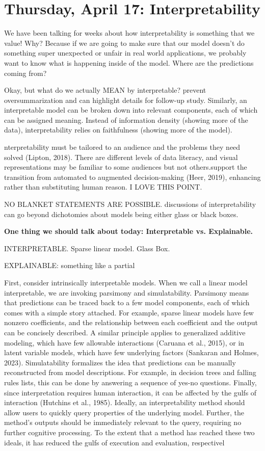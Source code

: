 \section{Thursday, April 17: Interpretability}

We have been talking for weeks about how interpretability is something that we value! Why? Because if we are going to make sure that our model doesn't do something super unexpected or unfair in real world applications, we probably want to know what is happening inside of the model. Where are the predictions coming from? 

Okay, but what do we actually MEAN by interpretable? prevent oversummarization and can
highlight details for follow-up study. Similarly, an interpretable model can be broken down into
relevant components, each of which can be assigned meaning. Instead of information density
(showing more of the data), interpretability relies on faithfulness (showing more of the model).


nterpretability must be tailored
to an audience and the problems they need solved (Lipton, 2018). There are different levels of
data literacy, and visual representations may be familiar to some audiences but not others.support the transition from automated to augmented decision-making (Heer, 2019), enhancing
rather than substituting human reason. I LOVE THIS POINT. 

NO BLANKET STATEMENTS ARE POSSIBLE. discussions of interpretability can go beyond dichotomies about models being either glass or black
boxes.

\textbf{One thing we should talk about today: Interpretable vs. Explainable.}

INTERPRETABLE. Sparse linear model. Glass Box. 

EXPLAINABLE: something like a partial 

 First,
consider intrinsically interpretable models. When we call a linear model interpretable, we are
invoking parsimony and simulatability. Parsimony means that predictions can be traced back to
a few model components, each of which comes with a simple story attached. For example, sparse
linear models have few nonzero coefficients, and the relationship between each coefficient and the
output can be concisely described. A similar principle applies to generalized additive modeling,
which have few allowable interactions (Caruana et al., 2015), or in latent variable models, which
have few underlying factors (Sankaran and Holmes, 2023). Simulatability formalizes the idea that
predictions can be manually reconstructed from model descriptions. For example, in decision trees
and falling rules lists, this can be done by answering a sequence of yes-no questions. Finally, since
interpretation requires human interaction, it can be affected by the gulfs of interaction (Hutchins
et al., 1985). Ideally, an interpretability method should allow users to quickly query properties
of the underlying model. Further, the method’s outputs should be immediately relevant to the
query, requiring no further cognitive processing. To the extent that a method has reached these
two ideals, it has reduced the gulfs of execution and evaluation, respectivel



